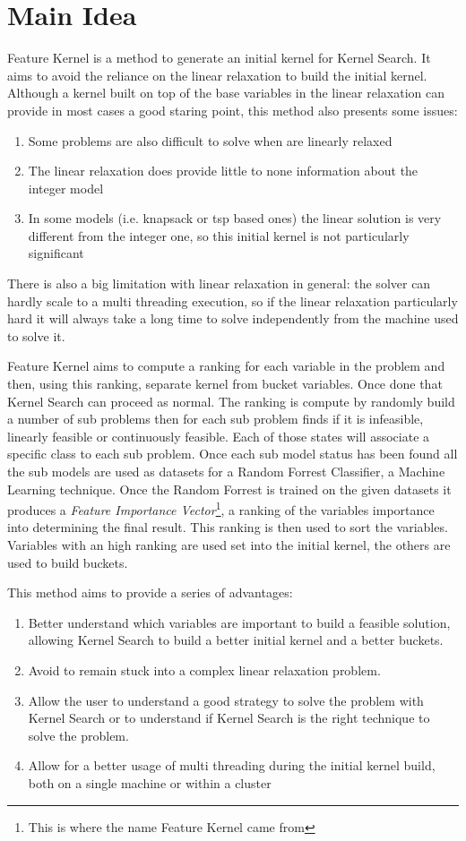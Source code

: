 \section{Main Idea}
Feature Kernel  is a method to generate an initial kernel for Kernel Search. 
It aims to avoid the reliance on the linear relaxation to build the initial 
kernel. Although a kernel built on top of the base variables in the linear relaxation can provide in most
cases a good staring point, this method also presents some issues:
\begin{enumerate}
    \item Some problems are also difficult to solve when are linearly relaxed
    \item The linear relaxation does provide little to none information about the integer model
    \item In some models (i.e. knapsack or tsp based ones) the linear solution is very different from 
    the integer one, so this initial kernel is not particularly significant 
\end{enumerate}

There is also a big limitation with linear relaxation in general: the solver can hardly scale to a multi threading execution, so 
if the linear relaxation particularly  hard it will always take a long time to solve independently from the machine used to solve it.

Feature Kernel aims to compute a ranking for each variable in the problem and then, using this ranking, separate kernel from bucket variables. Once 
done that Kernel Search can proceed as normal. The ranking is compute by randomly build a number of sub problems then for each sub problem finds if it
is infeasible, linearly feasible or continuously feasible. Each of those states will associate a specific class to each sub problem. Once each sub model status
has been found all the sub models are used as datasets for a Random Forrest Classifier, a Machine Learning technique. Once the Random Forrest is trained on
the given datasets it produces a \emph{Feature Importance Vector}\footnote{This is where the name Feature Kernel came from}, a ranking of the variables importance into determining the final result. 
This ranking is then used to sort the variables. Variables with an high ranking are used set into the initial kernel, the others are used to build buckets.

This method aims to provide a series of advantages:
\begin{enumerate}
    \item Better understand which variables are important to build a feasible solution, allowing Kernel Search to build a better initial kernel and a better buckets.
    \item Avoid to remain stuck into a complex linear relaxation problem.
    \item Allow the user to understand a good strategy to solve the problem with Kernel Search or to understand if Kernel Search is the right technique to solve the problem.
    \item Allow for a better usage of multi threading during the initial kernel build, both on a single machine or within a cluster
\end{enumerate}


